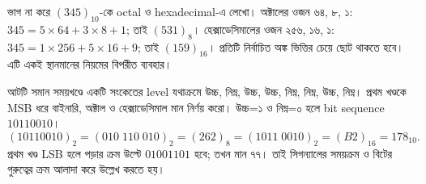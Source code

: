 ভাগ না করে $(345)_{10}$-কে octal ও hexadecimal-এ লেখো।
\chThreeAnswer অক্টালের ওজন ৬৪, ৮, ১: $345=5\times64+3\times8+1$; তাই $(531)_8$। হেক্সাডেসিমালের ওজন ২৫৬, ১৬, ১: $345=1\times256+5\times16+9$; তাই $(159)_{16}$। প্রতিটি নির্বাচিত অঙ্ক ভিত্তির চেয়ে ছোট থাকতে হবে। এটি একই স্থানমানের নিয়মের বিপরীত ব্যবহার।

আটটি সমান সময়খণ্ডে একটি সংকেতের level যথাক্রমে উচ্চ, নিম্ন, উচ্চ, উচ্চ, নিম্ন, নিম্ন, উচ্চ, নিম্ন। প্রথম খণ্ডকে MSB ধরে বাইনারি, অক্টাল ও হেক্সাডেসিমাল মান নির্ণয় করো।
\chThreeAnswer উচ্চ=১ ও নিম্ন=০ হলে bit sequence $10110010$।
\[(10110010)_2=(010\;110\;010)_2=(262)_8=(1011\;0010)_2=(B2)_{16}=178_{10}.\]
প্রথম খণ্ড LSB হলে পড়ার ক্রম উল্টে $01001101$ হবে; তখন মান ৭৭। তাই সিগন্যালের সময়ক্রম ও বিটের গুরুত্বের ক্রম আলাদা করে উল্লেখ করতে হয়।
